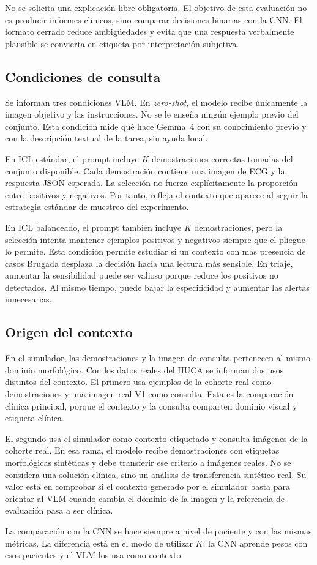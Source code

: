 No se solicita una explicación libre obligatoria. El objetivo de esta evaluación no es producir informes clínicos, sino comparar decisiones binarias con la CNN. El formato cerrado reduce ambigüedades y evita que una respuesta verbalmente plausible se convierta en etiqueta por interpretación subjetiva.

\subsection{Condiciones de consulta}
\label{sec:condiciones_vlm}

Se informan tres condiciones VLM. En \emph{zero-shot}, el modelo recibe únicamente la imagen objetivo y las instrucciones. No se le enseña ningún ejemplo previo del conjunto. Esta condición mide qué hace Gemma~4 con su conocimiento previo y con la descripción textual de la tarea, sin ayuda local.

En ICL estándar, el prompt incluye \(K\) demostraciones correctas tomadas del conjunto disponible. Cada demostración contiene una imagen de ECG y la respuesta JSON esperada. La selección no fuerza explícitamente la proporción entre positivos y negativos. Por tanto, refleja el contexto que aparece al seguir la estrategia estándar de muestreo del experimento.

En ICL balanceado, el prompt también incluye \(K\) demostraciones, pero la selección intenta mantener ejemplos positivos y negativos siempre que el pliegue lo permite. Esta condición permite estudiar si un contexto con más presencia de casos Brugada desplaza la decisión hacia una lectura más sensible. En triaje, aumentar la sensibilidad puede ser valioso porque reduce los positivos no detectados. Al mismo tiempo, puede bajar la especificidad y aumentar las alertas innecesarias.

\subsection{Origen del contexto}
\label{sec:origen_contexto_vlm}

En el simulador, las demostraciones y la imagen de consulta pertenecen al mismo dominio morfológico. Con los datos reales del HUCA se informan dos usos distintos del contexto. El primero usa ejemplos de la cohorte real como demostraciones y una imagen real V1 como consulta. Esta es la comparación clínica principal, porque el contexto y la consulta comparten dominio visual y etiqueta clínica.

El segundo usa el simulador como contexto etiquetado y consulta imágenes de la cohorte real. En esa rama, el modelo recibe demostraciones con etiquetas morfológicas sintéticas y debe transferir ese criterio a imágenes reales. No se considera una solución clínica, sino un análisis de transferencia sintético-real. Su valor está en comprobar si el contexto generado por el simulador basta para orientar al VLM cuando cambia el dominio de la imagen y la referencia de evaluación pasa a ser clínica.

La comparación con la CNN se hace siempre a nivel de paciente y con las mismas métricas. La diferencia está en el modo de utilizar \(K\): la CNN aprende pesos con esos pacientes y el VLM los usa como contexto.
